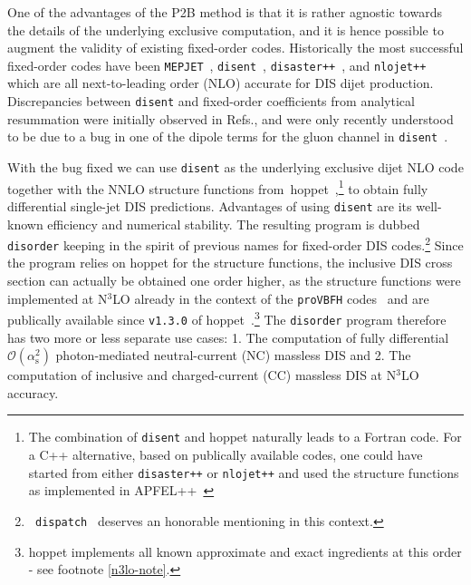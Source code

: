\documentclass[submission, PhysCodeb]{SciPost_better_arXiv}
\newcommand{\hoppet}{{\sc hoppet}}
\newcommand{\disent}{{\tt disent}}
\newcommand{\disorder}{{\tt disorder}}
\newcommand{\provbfh}{{\tt proVBFH}}
\newcommand{\disaster}{{\tt disaster++}}
\newcommand{\nlojet}{{\tt nlojet++}}
\newcommand{\as}{\alpha_{\mathrm{s}}}
\newcommand{\NNNLO}{N$^3$LO}
\begin{document}
One of the advantages of the P2B method is that it is rather agnostic
towards the details of the underlying exclusive computation, and it is
hence possible to augment the validity of existing fixed-order
codes. Historically the most successful fixed-order codes have been
{\tt MEPJET}~\cite{Mirkes:1995ks}, \disent{}~\cite{Catani:1996vz},
\disaster{}~\cite{Graudenz:1997gv}, and \nlojet{}~\cite{Nagy:2001xb}
which are all next-to-leading order (NLO) accurate for DIS dijet
production. Discrepancies between \disent{} and fixed-order
coefficients from analytical resummation were initially observed in
Refs.\cite{Antonelli:1999kx,Dasgupta:2002dc}, and were only recently
understood to be due to a bug in one of the dipole terms for the gluon
channel in \disent{}~\cite{Borsa:2020ulb,Borsa:2020yxh}.

With the bug fixed we can use \disent{} as the underlying exclusive
dijet NLO code together with the NNLO structure functions
from~\hoppet{}~\cite{Salam:2008qg,BertoneKarlberg},\footnote{The
combination of \disent{} and \hoppet{} naturally leads to a Fortran
code. For a C++ alternative, based on publically available codes, one
could have started from either \disaster{} or \nlojet{} and used the
structure functions as implemented in
APFEL++~\cite{Bertone:2013vaa,Bertone:2017gds}} to obtain fully
differential single-jet DIS predictions. Advantages of using \disent{}
are its well-known efficiency and numerical stability. The resulting
program is dubbed \disorder{} keeping in the spirit of previous names
for fixed-order DIS codes.\footnote{{\tt
  dispatch}~\cite{Dasgupta:2002dc} deserves an honorable mentioning in
this context.} Since the program relies on \hoppet{} for the structure
functions, the inclusive DIS cross section can actually be obtained
one order higher, as the structure functions were implemented at
\NNNLO{} already in the context of the \provbfh{}
codes~\cite{Cacciari:2015jma,Dreyer:2016oyx,Dreyer:2018qbw,Dreyer:2018rfu}
and are publically available since {\tt v1.3.0} of
\hoppet{}~\cite{hoppetv130}.\footnote{\hoppet{} implements all known
approximate and exact ingredients at this order - see footnote
\ref{n3lo-note}.} The \disorder{} program therefore has two more or
less separate use cases: 1. The computation of fully differential
$\mathcal{O}(\as^2)$ photon-mediated neutral-current (NC) massless DIS
and 2. The computation of inclusive and charged-current (CC) massless
DIS at \NNNLO{} accuracy.
\end{document}
